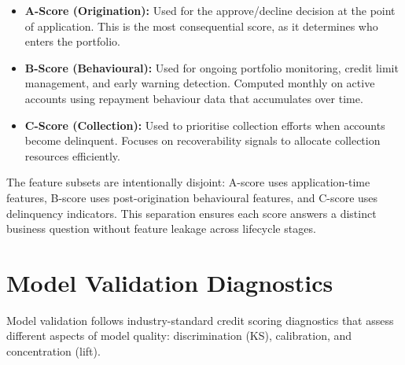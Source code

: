 \begin{itemize}
    \item \textbf{A-Score (Origination):} Used for the approve/decline decision at the point of application. This is the most consequential score, as it determines who enters the portfolio.
    \item \textbf{B-Score (Behavioural):} Used for ongoing portfolio monitoring, credit limit management, and early warning detection. Computed monthly on active accounts using repayment behaviour data that accumulates over time.
    \item \textbf{C-Score (Collection):} Used to prioritise collection efforts when accounts become delinquent. Focuses on recoverability signals to allocate collection resources efficiently.
\end{itemize}

The feature subsets are intentionally disjoint: A-score uses application-time features, B-score uses post-origination behavioural features, and C-score uses delinquency indicators. This separation ensures each score answers a distinct business question without feature leakage across lifecycle stages.





\section{Model Validation Diagnostics}
\label{sec:validation_diagnostics}

Model validation follows industry-standard credit scoring diagnostics that assess different aspects of model quality: discrimination (KS), calibration, and concentration (lift).

